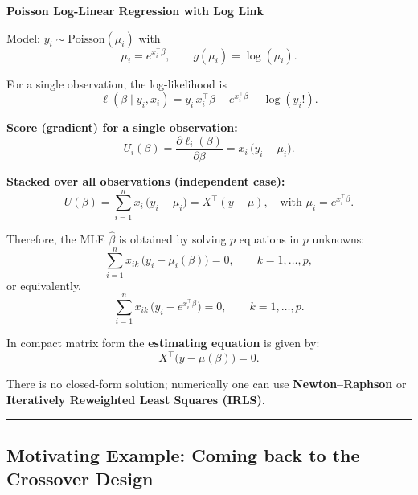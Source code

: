 \documentclass[
  letterpaper,
  DIV=11,
  numbers=noendperiod]{scrreprt}
\begin{document}
\begin{tcolorbox}[enhanced jigsaw, rightrule=.15mm, breakable, left=2mm, colframe=quarto-callout-tip-color-frame, opacityback=0, leftrule=.75mm, toprule=.15mm, colback=white, arc=.35mm, bottomrule=.15mm]

\textbf{Poisson Log-Linear Regression with Log Link}\vspace{2mm}

Model: \(y_{i} \sim \mathrm{Poisson}(\mu_{i})\) with\\
\[
\mu_{i} = e^{x_{i}^\top \beta}, \qquad g(\mu_i) = \log(\mu_i).
\]

For a single observation, the log-likelihood is \[
\ell(\beta \mid y_{i}, x_{i})
= y_{i}\,x_i^\top \beta - e^{x_i^\top \beta} - \log(y_i!).
\]

\textbf{Score (gradient) for a single observation:} \[
U_{i}(\beta)
= \frac{\partial \ell_{i}(\beta)}{\partial \beta}
= x_{i}\,\big(y_{i}-\mu_{i}\big).
\]

\textbf{Stacked over all observations (independent case):} \[
U(\beta)=\sum_{i=1}^n x_{i}\,\big(y_{i}-\mu_{i}\big)
= X^\top (y-\mu),
\quad \text{with } \mu_i = e^{x_i^\top \beta}.
\]

Therefore, the MLE \(\hat\beta\) is obtained by solving \(p\) equations
in \(p\) unknowns: \[
\sum_{i=1}^n x_{ik}\,\Big(y_i - \mu_i(\beta)\Big) = 0,
\qquad k=1,\dots,p,
\] or equivalently, \[
\sum_{i=1}^n x_{ik}\,\Big(y_i - e^{x_i^\top \beta}\Big) = 0,
\qquad k=1,\dots,p.
\]

In compact matrix form the \textbf{estimating equation} is given by: \[
X^\top\!\big(y-\mu(\beta)\big)=0.
\]

There is no closed-form solution; numerically one can use
\textbf{Newton--Raphson} or \textbf{Iteratively Reweighted Least Squares
(IRLS)}.

\end{tcolorbox}

\begin{center}\rule{0.5\linewidth}{0.5pt}\end{center}

\hypertarget{motivating-example-coming-back-to-the-crossover-design}{%
\subsection*{Motivating Example: Coming back to the Crossover
Design}\label{motivating-example-coming-back-to-the-crossover-design}}
\end{document}
